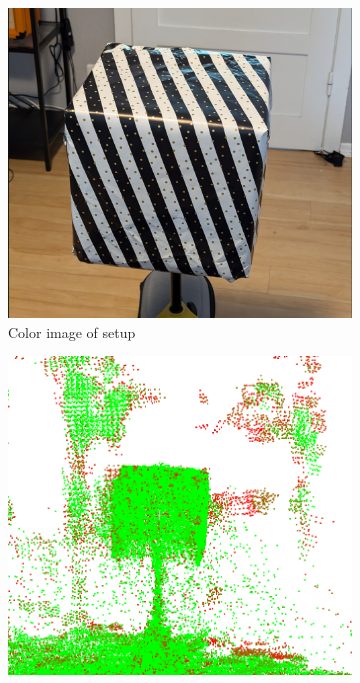 %
%

\begin{figure}[h!tp]
    \centering
    \begin{subfigure}[b]{0.33\textwidth}
        \centering
        \includegraphics[width=0.9\linewidth]{images/test-setup}
        \caption{Color image of setup}
    \end{subfigure}%
    \begin{subfigure}[b]{0.33\textwidth}
        \centering
        \includegraphics[width=0.9\linewidth]{images/test-setup-cloud}

\end{subfigure}
\end{figure}
